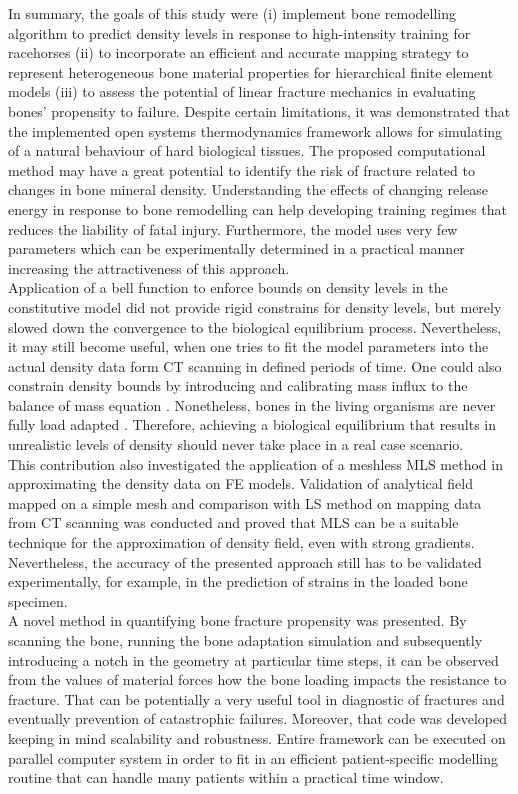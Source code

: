 \documentclass[11pt]{ACMEarticle}
\numberwithin{equation}{section}
\begin{document}
In summary, the goals of this study were (i) implement bone remodelling algorithm to predict density levels in response to high-intensity training for racehorses (ii) to incorporate an efficient and accurate mapping strategy to represent heterogeneous bone material properties for hierarchical finite element models (iii) to assess the potential of linear fracture mechanics in evaluating bones' propensity to failure. Despite certain limitations, it was demonstrated that the implemented open systems thermodynamics framework allows for simulating of a natural behaviour of hard biological tissues. The proposed computational method may have a great potential to identify the risk of fracture related to changes in bone mineral density. Understanding the effects of changing release energy in response to bone remodelling can help developing training regimes that reduces the liability of fatal injury. Furthermore, the model uses very few parameters which can be experimentally determined in a practical manner increasing the attractiveness of this approach.\\ 
Application of a bell function to enforce bounds on density levels in the constitutive model did not provide rigid constrains for density levels, but merely slowed down the convergence to the biological equilibrium process. Nevertheless, it may still become useful, when one tries to fit the model parameters into the actual density data form CT scanning in defined periods of time. One could also constrain density bounds by introducing and calibrating mass influx to the balance of mass equation \citep{sharma2013adaptive}. Nonetheless, bones in the living organisms are never fully load adapted \citep{christen2014bone}. Therefore, achieving a biological equilibrium that results in unrealistic levels of density should never take place in a real case scenario. \\
This contribution also investigated the application of a meshless MLS method in approximating the density data on FE models. Validation of analytical field mapped on a simple mesh and comparison with LS method on mapping data from CT scanning was conducted and proved that MLS can be a suitable technique for the approximation of density field, even with strong gradients. Nevertheless, the accuracy of the presented approach still has to be validated experimentally, for example, in the prediction of strains in the loaded bone specimen.  \\
A novel method in quantifying bone fracture propensity was presented. By scanning the bone, running the bone adaptation simulation and subsequently introducing a notch in the geometry at particular time steps, it can be observed from the values of material forces how the bone loading impacts the resistance to fracture. That can be potentially a very useful tool in diagnostic of fractures and eventually prevention of catastrophic failures. Moreover, that code was developed keeping in mind scalability and robustness. Entire framework can be executed on parallel computer system in order to fit in an efficient patient-specific modelling routine that can handle many patients within a practical time window. \\
\end{document}
